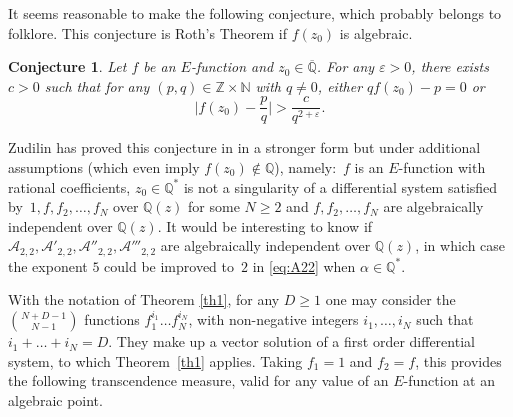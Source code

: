 \documentclass[JEP,XML,SOM,Unicode,published]{cedram}
\newcommand{\Efunction}{$E$\nobreakdash-func\-tion\xspace}
\newtheorem{conj}{Conjecture}
\theoremstyle{definition}
\newcommand{\Z}{\mathbb{Z}}
\newcommand{\Qbar}{\overline{\mathbb Q}}
\let\eps\varepsilon
\begin{document}
It seems reasonable to make the following conjecture, which probably belongs to folklore.
This conjecture is Roth's Theorem if $f(z_0)$ is algebraic.
\begin{conj} \label{conjmu2}
Let $f$ be an \Efunction and $z_0\in\Qbar$. For any $\eps>0$, there exists $c>0$ such that for any $(p,q)\in\Z\times \mathbb N$ with $q\neq 0$, either $q f(z_0)-p=0 $ or\vspace*{-3pt}
\[
\Big| f(z_0)-\frac p q \Big| > \frac c {q^{2+\eps}}.
\]
\end{conj}
Zudilin has proved this conjecture in \cite{zudilin} in a stronger form but under additional assumptions (which even imply $f(z_0)\notin \mathbb Q$), namely:~$f$ is an \Efunction with ratio\-nal coefficients, $z_0\in \mathbb Q^*$ is not a singularity of a differential system satisfied by~$1, f, f_2, \ldots, f_N$ over $\mathbb Q(z)$ for some $N\ge 2$ and $f, f_2, \ldots, f_N$ are algebraically independent over $\mathbb Q(z)$. It would be interesting to know if $\mathcal{A}_{2,2}, \mathcal{A}'_{2,2}, \mathcal{A}''_{2,2}, \mathcal{A}'''_{2,2}$ are alge\-braically independent over $\mathbb Q(z)$, in which case the exponent $5$ could be improved to~$2$ in \eqref{eq:A22} when $\alpha\in \mathbb Q^*$.

With the notation of Theorem \ref{th1}, for any $D\geq 1$ one may consider the $\binom{N+D-1}{N-1 }$ functions $f_1^{i_1}\ldots f_N^{i_N}$, with non-negative integers $i_1,\ldots,i_N$ such that $i_1+\ldots+i_N=D$. They make up a vector solution of a first order differential system, to which Theorem~\ref{th1} applies. Taking $f_1=1$ and $f_2=f$, this provides the following transcendence measure, valid for any value of an \Efunction at an algebraic point.
\end{document}
